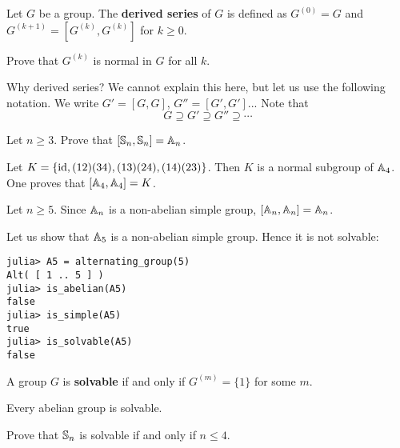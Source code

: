 \begin{definition}
    Let $G$ be a group. The \textbf{derived series} of $G$ 
    is defined as $G^{(0)}=G$ and
    $G^{(k+1)}=[G^{(k)},G^{(k)}]$ for $k\geq 0$. 
\end{definition}

\begin{exercise}
    Prove that $G^{(k)}$ is normal in $G$ for all $k$. 
\end{exercise}

Why derived series? We cannot explain this here, but let us use the following
notation. 
We write $G'=[G,G]$, $G''=[G',G']$... 
Note that 
\[
G\supseteq G'\supseteq G''\supseteq\cdots
\]


\begin{exercise}
    Let $n\geq3$. Prove that 
    $[\mathbb{S}_n,\mathbb{S}_n]=\mathbb{A}_n$. 
\end{exercise}

\begin{example}
    Let $K=\{\operatorname{id},(12)(34),(13)(24),(14)(23)\}$. Then 
    $K$ is a normal subgroup of $\mathbb{A}_4$. 
    One proves that $[\mathbb{A}_4,\mathbb{A}_4]=K$. 
\end{example}

\begin{example}
    Let $n\geq5$. Since $\mathbb{A}_n$ is a non-abelian simple group, 
    $[\mathbb{A}_n,\mathbb{A}_n]=\mathbb{A}_n$. 
\end{example}

Let us show that $\mathbb{A}_5$ is a non-abelian simple group. Hence
it is not solvable: 
\begin{lstlisting}
julia> A5 = alternating_group(5)
Alt( [ 1 .. 5 ] )
julia> is_abelian(A5)
false
julia> is_simple(A5)
true
julia> is_solvable(A5)
false
\end{lstlisting}

\begin{definition}
    A group $G$ is \textbf{solvable} if and only if
    $G^{(m)}=\{1\}$ for some $m$. 
\end{definition}

Every abelian group is solvable. 

\begin{exercise}
    Prove that $\mathbb{S}_n$ is solvable if and only if $n\leq4$. 
\end{exercise}

